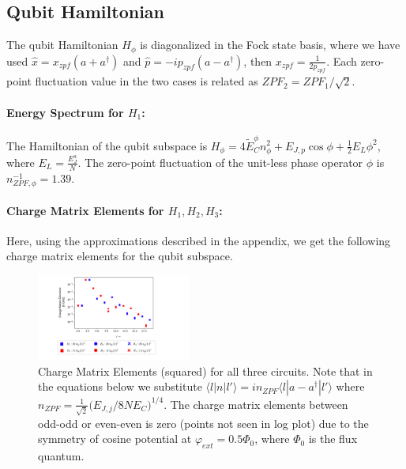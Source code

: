 \documentclass[%
reprint,
superscriptaddress,
 amsmath,amssymb,
 aps,
 prx,
longbibliography,
floatfix,
]{revtex4-2}
\begin{document}
\subsection{Qubit Hamiltonian}\label{app:coupling}
The qubit Hamiltonian $H_{\phi}$ is diagonalized in the Fock state basis, where we have used $\hat x=x_{zpf}(a+a^\dagger)$ and $\hat p=-ip_{zpf}(a-a^\dagger)$, then $x_{zpf}=\frac{1}{2p_{zpf}}$. Each zero-point fluctuation value in the two cases is related as $ZPF_2=ZPF_1/\sqrt{2}$. \paragraph{Energy Spectrum for $H_1$:}
The Hamiltonian of the qubit subspace is $H_\phi=4\tilde{E}_C^\phi n_\phi^2+E_{J,p}\cos{\phi}+\frac{1}{2}E_L\phi^2$, where $E_L=\frac{E_J^a}{N}$. The zero-point fluctuation of the unit-less phase operator $\phi$ is $n_{ZPF,\phi}^{-1}=1.39$. 
\paragraph{Charge Matrix Elements for $H_1,H_2,H_3$:}
Here, using the approximations described in the appendix, we get the following charge matrix elements for the qubit subspace.
\begin{figure}[tbh]
    \centering
\includegraphics[width=0.45\textwidth]{Figures/Charge_Matrix.pdf}
    \caption{Charge Matrix Elements (squared) for all three circuits. Note that in the equations below we substitute $\langle l|n|l'\rangle=in_{ZPF}\langle l|a-a^\dagger|l'\rangle$ where $n_{ZPF}=\frac{1}{\sqrt{2}}\Big(E_{J,j}/8NE_C\Big)^{1/4}$. The charge matrix elements between odd-odd or even-even is zero (points not seen in log plot) due to the symmetry of cosine potential at $\varphi_{ext}=0.5\Phi_0$, where $\Phi_0$ is the flux quantum.}
    \label{charge-matrix}
\end{figure}
\end{document}
